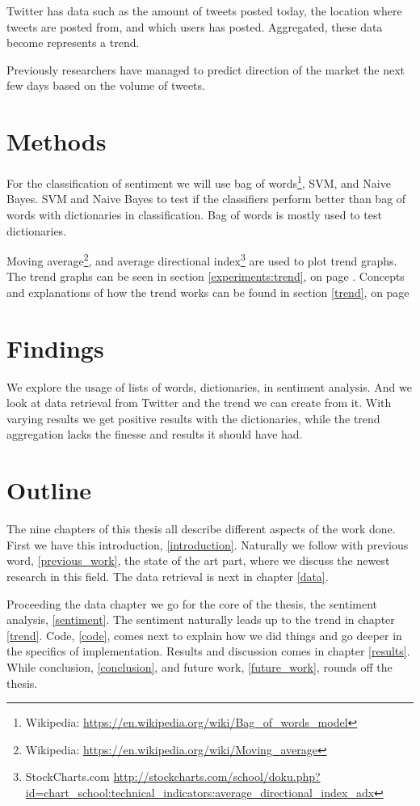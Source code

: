 Twitter has data such as the amount of tweets posted today, the location where
tweets are posted from, and which users has posted. Aggregated, these data
become represents a trend.  

Previously researchers have managed to predict direction of the market the
next few days based on the volume of tweets. 

\section{Methods}

For the classification of sentiment we will use bag of words\footnote{Wikipedia:
\url{https://en.wikipedia.org/wiki/Bag_of_words_model}}, SVM, and Naive Bayes.
SVM and Naive Bayes to test if the classifiers perform better than bag of words
with dictionaries in classification. Bag of words is mostly used to test
dictionaries.

Moving average\footnote{Wikipedia:
\url{https://en.wikipedia.org/wiki/Moving_average}}, and average directional
index\footnote{StockCharts.com
\url{http://stockcharts.com/school/doku.php?id=chart_school:technical_indicators:average_directional_index_adx}}
are used to plot trend graphs. The trend graphs can be seen in section
\ref{experiments:trend}, on
page \pageref{experiments:trend}. Concepts and explanations of how the trend
works can be found in section \ref{trend}, on page \pageref{trend}

\section{Findings}
We explore the usage of lists of words, dictionaries, in sentiment analysis.
And we look at data retrieval from Twitter and the trend we can create from it. 
With varying results we get positive results with the dictionaries, while the
trend aggregation lacks the finesse and results it should have had. 

\section{Outline}
The nine chapters of this thesis all describe different aspects of the work
done. First we have this introduction, \ref{introduction}. Naturally we follow
with previous word, \ref{previous_work}, the state of the art part, where we
discuss the newest research in this field. The data retrieval is next in
chapter \ref{data}. 

Proceeding the data chapter we go for the core of the thesis, the sentiment
analysis, \ref{sentiment}. The sentiment naturally leads up to the trend in
chapter \ref{trend}. Code, \ref{code}, comes next to explain how we did things
and go deeper in the specifics of implementation. Results and discussion comes
in chapter \ref{results}. While conclusion, \ref{conclusion}, and future work,
\ref{future_work}, rounds off the thesis.
%
